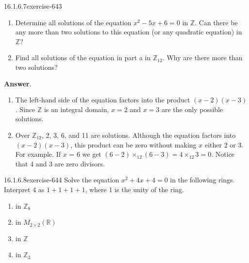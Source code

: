 \documentclass[twoside,10pt,]{book}
\numberwithin{equation}{section}
\begin{document}
\begin{divisionsolution}{16.1.6.7}{}{exercise-643}%
\hypertarget{p-5812}{}%
\leavevmode%
\begin{enumerate}[label=(\alph*)]
\item\hypertarget{li-2564}{}\hypertarget{p-5813}{}%
Determine all solutions of the equation \(x^2 - 5x + 6 = 0\) in \(\mathbb{Z}\).  Can there be any more than two solutions to this equation (or any quadratic equation) in \(\mathbb{Z}\)?%
\item\hypertarget{li-2565}{}\hypertarget{p-5814}{}%
Find all solutions of the equation in part a in \(\mathbb{Z}_{12}\). Why are there more than two solutions?%
\end{enumerate}
%
\par\smallskip%
\noindent\textbf{Answer}.\quad%
\hypertarget{p-5815}{}%
\leavevmode%
\begin{enumerate}[label=(\alph*)]
\item\hypertarget{li-2566}{}\hypertarget{p-5816}{}%
The left-hand side of the equation factors into the product \((x-2)(x-3)\). Since \(\mathbb{Z}\) is an integral domain, \(x = 2\) and \(x =3\) are the only possible solutions.%
\item\hypertarget{li-2567}{}\hypertarget{p-5817}{}%
Over \(\mathbb{Z}_{12}\), 2, 3, 6, and 11 are solutions. Although the equation factors into \((x-2)(x-3)\), this product can be zero without making \(x\) either 2 or 3. For example. If \(x\) = 6 we get  \((6-2)\times _{12}(6-3)=4 \times _{12}3 = 0\).  Notice that  4 and 3 are zero divisors.%
\end{enumerate}
%
\end{divisionsolution}%
\begin{divisionsolution}{16.1.6.8}{}{exercise-644}%
\hypertarget{p-5818}{}%
Solve the equation \(x^2 +4x + 4 = 0\) in the following rings. Interpret 4 as \(1 + 1 + 1 + 1\), where 1 is the unity of the ring.\leavevmode%
\begin{enumerate}[label=(\alph*)]
\item\hypertarget{li-2568}{}\hypertarget{p-5819}{}%
in  \(\mathbb{Z}_8\)%
\item\hypertarget{li-2569}{}\hypertarget{p-5820}{}%
in \(M_{2\times 2}(\mathbb{R})\)%
\item\hypertarget{li-2570}{}\hypertarget{p-5821}{}%
in  \(\mathbb{Z}\)%
\item\hypertarget{li-2571}{}\hypertarget{p-5822}{}%
in  \(\mathbb{Z}_3\)%
\end{enumerate}
%
\end{divisionsolution}%
\end{document}
